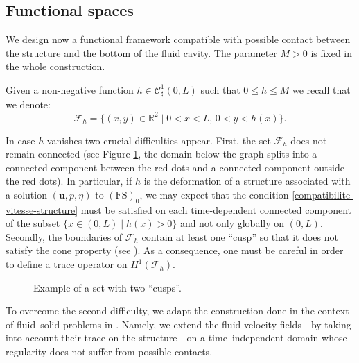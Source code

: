 \documentclass[10pt]{amsart}
\let\mathcal\mathscr
\newcommand{\FS}{\mathrm{FS}}
\theoremstyle{remark}
\theoremstyle{definition}
\newcommand{\ug}{\boldsymbol{u}}
\begin{document}
\subsection{Functional spaces}
We design now a functional framework compatible with possible contact between the structure and the bottom of the fluid cavity. The param\-e\-ter $M > 0$ is fixed in the whole construction.

Given a non-negative function $h \in \mathcal{C}^{1}_{\sharp}(0,L)$ such that $0\leq h \leq M$ we recall that we denote:
\[
\mathcal{F}_{h}=\{(x,y)\in\mathbb{R}^{2}\mid 0<x<L,\,0<y<h(x)\}.
\]

In case $h$ vanishes two crucial difficulties appear.
First, the set $\mathcal{F}_{h}$ does not remain connected (see Figure \ref{fig_cusp}, the domain below the graph splits into a connected component between the red dots and a connected component outside the red dots). In particular, if $h$ is the deformation of a structure associated with a solution $(\ug,p,\eta)$ to
$(\FS)_0$, we may expect that the condition \eqref{compatibilite-vitesse-structure} must be satisfied on each time-dependent connected component of the subset $\{x \in (0, L)\mid h(x) >0\}$ and not only globally on $(0,L)$.
Secondly, the boundaries of $\mathcal{F}_{h}$ contain at least one ``cusp'' so that it does not satisfy the cone property (see \cite{Adams}). As a consequence, one must be careful in order to define a trace operator on $H^{1}(\mathcal F_h)$.

\begin{figure}[!ht]
\centering\smaller
{}
\vspace*{-\baselineskip}
\caption{Example of a set with two ``cusps''. \label{fig_cusp}}
\end{figure}

To overcome the second difficulty, we adapt the construction done in the context of fluid--solid problems in \cite{SanMartin-Starovoitov-Tucsnak}. Namely, we extend the fluid velocity fields---by taking into account their trace on the structure---on a time--independent domain whose regularity does not suffer from possible contacts.
\end{document}
